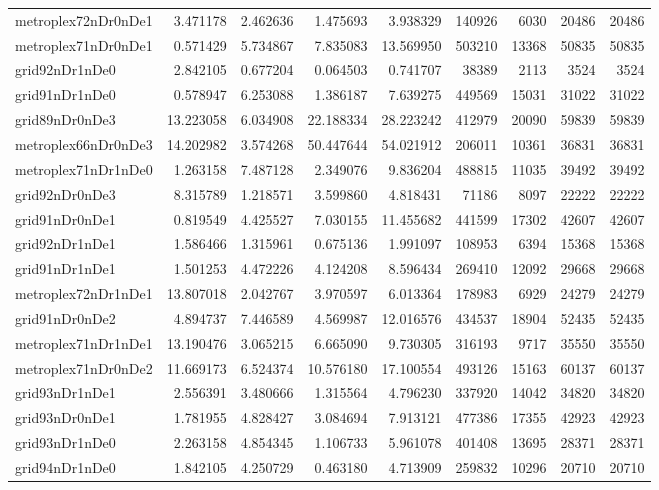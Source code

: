 \begin{longtable}{|l|r|r|r|r|r|r|r|r|}
metroplex72nDr0nDe1 & 3.471178 & 2.462636 & 1.475693 & 3.938329 & 140926 & 6030 & 20486 & 20486 \\
metroplex71nDr0nDe1 & 0.571429 & 5.734867 & 7.835083 & 13.569950 & 503210 & 13368 & 50835 & 50835 \\
grid92nDr1nDe0 & 2.842105 & 0.677204 & 0.064503 & 0.741707 & 38389 & 2113 & 3524 & 3524 \\
grid91nDr1nDe0 & 0.578947 & 6.253088 & 1.386187 & 7.639275 & 449569 & 15031 & 31022 & 31022 \\
grid89nDr0nDe3 & 13.223058 & 6.034908 & 22.188334 & 28.223242 & 412979 & 20090 & 59839 & 59839 \\
metroplex66nDr0nDe3 & 14.202982 & 3.574268 & 50.447644 & 54.021912 & 206011 & 10361 & 36831 & 36831 \\
metroplex71nDr1nDe0 & 1.263158 & 7.487128 & 2.349076 & 9.836204 & 488815 & 11035 & 39492 & 39492 \\
grid92nDr0nDe3 & 8.315789 & 1.218571 & 3.599860 & 4.818431 & 71186 & 8097 & 22222 & 22222 \\
grid91nDr0nDe1 & 0.819549 & 4.425527 & 7.030155 & 11.455682 & 441599 & 17302 & 42607 & 42607 \\
grid92nDr1nDe1 & 1.586466 & 1.315961 & 0.675136 & 1.991097 & 108953 & 6394 & 15368 & 15368 \\
grid91nDr1nDe1 & 1.501253 & 4.472226 & 4.124208 & 8.596434 & 269410 & 12092 & 29668 & 29668 \\
metroplex72nDr1nDe1 & 13.807018 & 2.042767 & 3.970597 & 6.013364 & 178983 & 6929 & 24279 & 24279 \\
grid91nDr0nDe2 & 4.894737 & 7.446589 & 4.569987 & 12.016576 & 434537 & 18904 & 52435 & 52435 \\
metroplex71nDr1nDe1 & 13.190476 & 3.065215 & 6.665090 & 9.730305 & 316193 & 9717 & 35550 & 35550 \\
metroplex71nDr0nDe2 & 11.669173 & 6.524374 & 10.576180 & 17.100554 & 493126 & 15163 & 60137 & 60137 \\
grid93nDr1nDe1 & 2.556391 & 3.480666 & 1.315564 & 4.796230 & 337920 & 14042 & 34820 & 34820 \\
grid93nDr0nDe1 & 1.781955 & 4.828427 & 3.084694 & 7.913121 & 477386 & 17355 & 42923 & 42923 \\
grid93nDr1nDe0 & 2.263158 & 4.854345 & 1.106733 & 5.961078 & 401408 & 13695 & 28371 & 28371 \\
grid94nDr1nDe0 & 1.842105 & 4.250729 & 0.463180 & 4.713909 & 259832 & 10296 & 20710 & 20710 \\

\end{longtable}
